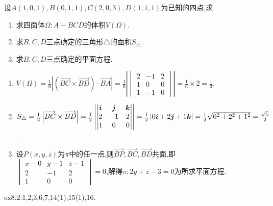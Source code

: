 \begin{example}
    设$A(1,0,1),B(0,1,1),C(2,0,3),D(1,1,1)$为已知的四点,求
    \begin{enumerate}
        \item 求四面体$\Omega:A-BCD$的体积$V(\Omega)$.
        \item 求$B,C,D$三点确定的三角形$\triangle$的面积$S_\triangle$.
        \item 求$B,C,D$三点确定的平面方程.
    \end{enumerate}
\end{example}
\begin{solution}
    \begin{enumerate}
        \item $V(\Omega)=\frac{1}{6}\left|(\overrightarrow{BC}\times\overrightarrow{BD})\cdot\overrightarrow{BA}\right|=\frac{1}{6}\left|\begin{vmatrix}2&-1&2\\1&0&0\\1&-1&0\end{vmatrix}\right|=\frac{1}{6}\times2=\frac{1}{3}$.
        \item $S_\triangle=\frac{1}{2}\left|\overrightarrow{BC}\times\overrightarrow{BD}\right|=\frac{1}{2}\left|\begin{vmatrix}\bm{i}&\bm{j}&\bm{k}\\2&-1&2\\1&0&0\end{vmatrix}\right|=\frac{1}{2}\left|0\bm{i}+2\bm{j}+1\bm{k}\right|=\frac{1}{2}\sqrt{0^2+2^2+1^2}=\frac{\sqrt{5}}{2}$.
        \item 设$P(x,y,z)$为$\pi$中的任一点,则$\overrightarrow{BP},\overrightarrow{BC},\overrightarrow{BD}$共面,即$\begin{vmatrix}x-0&y-1&z-1\\2&-1&2\\1&0&0\end{vmatrix}=0$,解得$\pi:2y+z-3=0$为所求平面方程.
    \end{enumerate}
\end{solution}

\begin{homework} 
    ex8.2:1,2,3,6,7,14(1),15(1),16.
\end{homework}